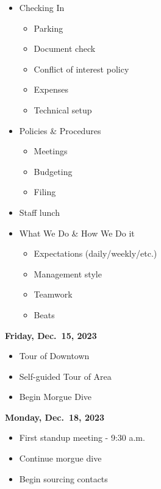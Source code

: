 \documentclass[
  12pt,
  american,
  letterpaperpaper,
  extrafontsizes,onecolumn,openright
  ]{memoir}
\providecommand{\tightlist}{%
  \setlength{\itemsep}{0pt}\setlength{\parskip}{0pt}}
\begin{document}
\begin{itemize}
\item
  Checking In

  \begin{itemize}
  \tightlist
  \item
    Parking
  \item
    Document check
  \item
    Conflict of interest policy
  \item
    Expenses
  \item
    Technical setup
  \end{itemize}
\item
  Policies \& Procedures

  \begin{itemize}
  \tightlist
  \item
    Meetings
  \item
    Budgeting
  \item
    Filing
  \end{itemize}
\item
  Staff lunch
\item
  What We Do \& How We Do it

  \begin{itemize}
  \tightlist
  \item
    Expectations (daily/weekly/etc.)
  \item
    Management style
  \item
    Teamwork
  \item
    Beats
  \end{itemize}
\end{itemize}

\textbf{Friday, Dec.~15, 2023}

\begin{itemize}
\tightlist
\item
  Tour of Downtown
\item
  Self-guided Tour of Area
\item
  Begin Morgue Dive
\end{itemize}

\textbf{Monday, Dec.~18, 2023}

\begin{itemize}
\tightlist
\item
  First standup meeting - 9:30 a.m.
\item
  Continue morgue dive
\item
  Begin sourcing contacts
\end{itemize}
\end{document}
